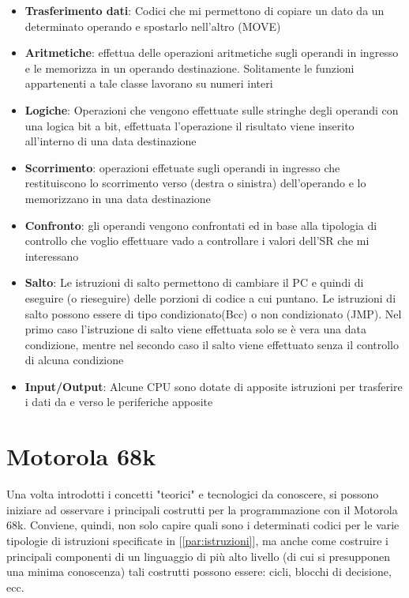 \begin{itemize}
    \item \textbf{Trasferimento dati}: Codici che mi permettono di copiare un dato da un determinato operando e spostarlo nell'altro (MOVE)
    
    \item \textbf{Aritmetiche}: effettua delle operazioni aritmetiche sugli operandi in ingresso e le memorizza in un operando destinazione. Solitamente le funzioni appartenenti a tale classe lavorano su numeri interi

    \item \textbf{Logiche}: Operazioni che vengono effettuate sulle stringhe degli operandi con una logica bit a bit, effettuata l'operazione il risultato viene inserito all'interno di una data destinazione

    \item \textbf{Scorrimento}: operazioni effetuate sugli operandi in ingresso che restituiscono lo scorrimento verso (destra o sinistra) dell'operando e lo memorizzano in una data destinazione

    \item \textbf{Confronto}: gli operandi vengono confrontati ed in base alla tipologia di controllo che voglio effettuare vado a controllare i valori dell'SR che mi interessano

    \item \textbf{Salto}: Le istruzioni di salto permettono di cambiare il PC e quindi di eseguire (o rieseguire) delle porzioni di codice a cui puntano. Le istruzioni di salto possono essere di tipo condizionato(Bcc) o non condizionato (JMP). Nel primo caso l'istruzione di salto viene effettuata solo se è vera una data condizione, mentre nel secondo caso il salto viene effettuato senza il controllo di alcuna condizione

    \item \textbf{Input/Output}: Alcune CPU sono dotate di apposite istruzioni per trasferire i dati da e verso le periferiche apposite
\end{itemize}

\section{Motorola 68k}
Una volta introdotti i concetti "teorici" e tecnologici da conoscere, si possono iniziare ad osservare i principali costrutti per la programmazione con il Motorola 68k.
Conviene, quindi, non solo capire quali sono i determinati codici per le varie tipologie di istruzioni specificate in [\ref{par:istruzioni}], ma anche come costruire i principali componenti di un linguaggio di più alto livello (di cui si presupponen una minima conoscenza) tali costrutti possono essere: cicli, blocchi di decisione, ecc.


